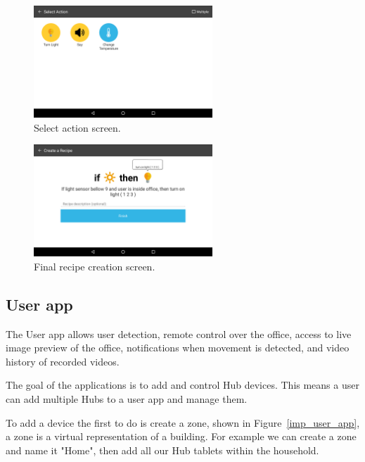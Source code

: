 \begin{figure}[H]
\centering
\includegraphics[width=0.6\textwidth]{Figures/screen_actions}
\caption{Select action screen.}
\label{screen_actions}
\end{figure}

\begin{figure}[H]
\centering
\includegraphics[width=0.6\textwidth]{Figures/screen_completed_recipe}
\caption{Final recipe creation screen.}
\label{screen_completed_recipe}
\end{figure}





\subsection{User app}


The User app allows user detection, remote control over the office, access to live image preview of the office, notifications when movement is detected, and video history of recorded videos.

The goal of the applications is to add and control Hub devices. This means a user can add multiple Hubs to a user app and manage them. 

To add a device the first to do is create a zone, shown in Figure~\ref{imp_user_app}, a zone is a virtual representation of a building. For example we can create a zone and name it "Home", then add all our Hub tablets within the household. 

